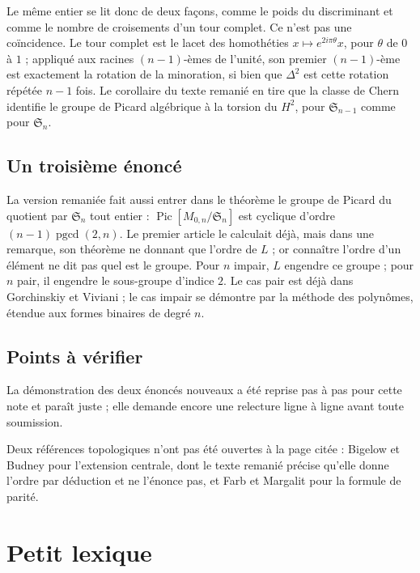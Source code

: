 \documentclass[11pt,a4paper]{amsart}
\theoremstyle{definition}
\theoremstyle{plain}
\theoremstyle{remark}
\newcommand{\M}{M_{0,n}}
\newcommand{\Sn}{\mathfrak S}
\newcommand{\Pic}{\operatorname{Pic}}
\begin{document}
Le même entier se lit donc de deux façons, comme le poids du discriminant et comme le nombre de croisements d'un tour complet. Ce n'est pas une coïncidence. Le tour complet est le lacet des homothéties $x \mapsto e^{2i\pi\theta}x$, pour $\theta$ de $0$ à $1$ ; appliqué aux racines $(n-1)$-èmes de l'unité, son premier $(n-1)$-ème est exactement la rotation de la minoration, si bien que $\Delta^2$ est cette rotation répétée $n-1$ fois. Le corollaire du texte remanié en tire que la classe de Chern identifie le groupe de Picard algébrique à la torsion du $H^2$, pour $\Sn_{n-1}$ comme pour $\Sn_n$.

\subsection{Un troisième énoncé}

La version remaniée fait aussi entrer dans le théorème le groupe de Picard du quotient par $\Sn_n$ tout entier : $\Pic[\M/\Sn_n]$ est cyclique d'ordre $(n-1)\operatorname{pgcd}(2,n)$. Le premier article le calculait déjà, mais dans une remarque, son théorème ne donnant que l'ordre de $L$ ; or connaître l'ordre d'un élément ne dit pas quel est le groupe. Pour $n$ impair, $L$ engendre ce groupe ; pour $n$ pair, il engendre le sous-groupe d'indice $2$. Le cas pair est déjà dans Gorchinskiy et Viviani ; le cas impair se démontre par la méthode des polynômes, étendue aux formes binaires de degré $n$.

\subsection{Points à vérifier}

La démonstration des deux énoncés nouveaux a été reprise pas à pas pour cette note et paraît juste ; elle demande encore une relecture ligne à ligne avant toute soumission.

Deux références topologiques n'ont pas été ouvertes à la page citée : Bigelow et Budney pour l'extension centrale, dont le texte remanié précise qu'elle donne l'ordre par déduction et ne l'énonce pas, et Farb et Margalit pour la formule de parité.

\section{Petit lexique}
\end{document}
